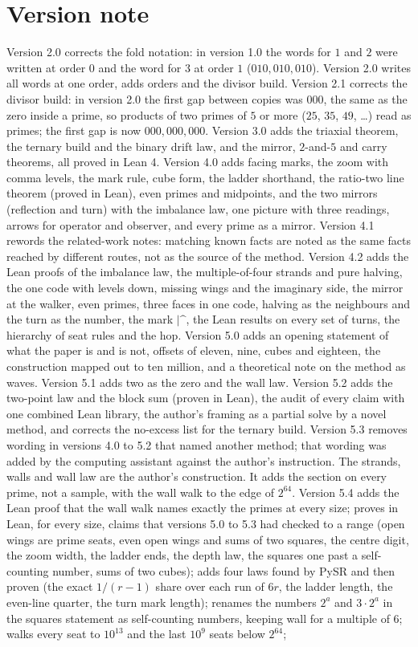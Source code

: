 \documentclass[11pt]{article}
\begin{document}
\section*{Version note}
Version 2.0 corrects the fold notation: in version 1.0 the words for $1$ and $2$ were written at order $0$ and the word for $3$ at order $1$ ($010,010,010$). Version 2.0 writes all words at one order, adds orders and the divisor build. Version 2.1 corrects the divisor build: in version 2.0 the first gap between copies was $000$, the same as the zero inside a prime, so products of two primes of $5$ or more ($25$, $35$, $49$, \dots) read as primes; the first gap is now $000,000,000$. Version 3.0 adds the triaxial theorem, the ternary build and the binary drift law, and the mirror, $2$-and-$5$ and carry theorems, all proved in Lean 4. Version 4.0 adds facing marks, the zoom with comma levels, the mark rule, cube form, the ladder shorthand, the ratio-two line theorem (proved in Lean), even primes and midpoints, and the two mirrors (reflection and turn) with the imbalance law, one picture with three readings, arrows for operator and observer, and every prime as a mirror. Version 4.1 rewords the related-work notes: matching known facts are noted as the same facts reached by different routes, not as the source of the method. Version 4.2 adds the Lean proofs of the imbalance law, the multiple-of-four strands and pure halving, the one code with levels down, missing wings and the imaginary side, the mirror at the walker, even primes, three faces in one code, halving as the neighbours and the turn as the number, the mark $|\text{\textasciicircum}$, the Lean results on every set of turns, the hierarchy of seat rules and the hop. Version 5.0 adds an opening statement of what the paper is and is not, offsets of eleven, nine, cubes and eighteen, the construction mapped out to ten million, and a theoretical note on the method as waves. Version 5.1 adds two as the zero and the wall law. Version 5.2 adds the two-point law and the block sum (proven in Lean), the audit of every claim with one combined Lean library, the author's framing as a partial solve by a novel method, and corrects the no-excess list for the ternary build. Version 5.3 removes wording in versions 4.0 to 5.2 that named another method; that wording was added by the computing assistant against the author's instruction. The strands, walls and wall law are the author's construction. It adds the section on every prime, not a sample, with the wall walk to the edge of $2^{64}$. Version 5.4 adds the Lean proof that the wall walk names exactly the primes at every size; proves in Lean, for every size, claims that versions 5.0 to 5.3 had checked to a range (open wings are prime seats, even open wings and sums of two squares, the centre digit, the zoom width, the ladder ends, the depth law, the squares one past a self-counting number, sums of two cubes); adds four laws found by PySR and then proven (the exact $1/(r-1)$ share over each run of $6r$, the ladder length, the even-line quarter, the turn mark length); renames the numbers $2^a$ and $3\cdot2^a$ in the squares statement as self-counting numbers, keeping wall for a multiple of $6$; walks every seat to $10^{13}$ and the last $10^9$ seats below $2^{64}$; 
\end{document}

